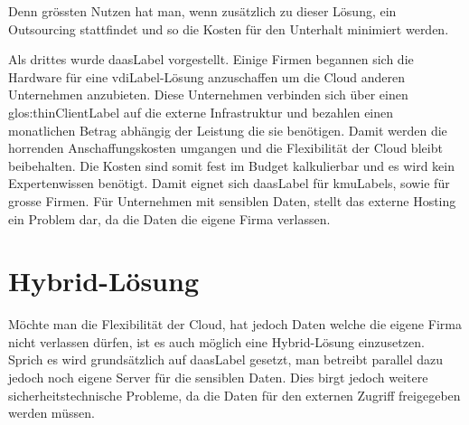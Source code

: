Denn grössten Nutzen hat man, wenn zusätzlich zu dieser Lösung, ein Outsourcing stattfindet und so die Kosten für den Unterhalt minimiert werden. 

Als drittes wurde \Gls{daasLabel} vorgestellt. Einige Firmen begannen sich die Hardware für eine \Gls{vdiLabel}-Lösung anzuschaffen um die Cloud anderen Unternehmen anzubieten. Diese Unternehmen verbinden sich über einen \Gls{glos:thinClientLabel} auf die externe Infrastruktur und bezahlen einen monatlichen Betrag abhängig der Leistung die sie benötigen. Damit werden die horrenden Anschaffungskosten umgangen und die Flexibilität der Cloud bleibt beibehalten. Die Kosten sind somit fest im Budget kalkulierbar und es wird kein Expertenwissen benötigt. Damit eignet sich \Gls{daasLabel} für \Glspl{kmuLabel}, sowie für grosse Firmen. Für Unternehmen mit sensiblen Daten, stellt das externe Hosting ein Problem dar, da die Daten die eigene Firma verlassen.

\section{Hybrid-Lösung}
Möchte man die Flexibilität der Cloud, hat jedoch Daten welche die eigene Firma nicht verlassen dürfen, ist es auch möglich eine Hybrid-Lösung einzusetzen. Sprich es wird grundsätzlich auf \Gls{daasLabel} gesetzt, man betreibt parallel dazu jedoch noch eigene Server für die sensiblen Daten.
Dies birgt jedoch weitere sicherheitstechnische Probleme, da die Daten für den externen Zugriff freigegeben werden müssen.



\glsaddall
